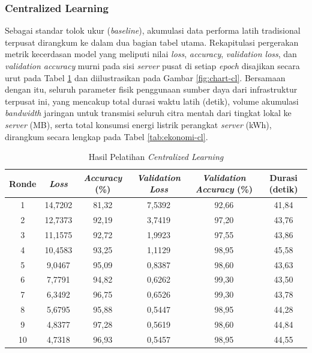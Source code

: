 \subsubsection{Centralized Learning}

Sebagai standar tolok ukur (\textit{baseline}), akumulasi data performa latih tradisional terpusat dirangkum ke dalam dua bagian tabel utama. Rekapitulasi pergerakan metrik kecerdasan model yang meliputi nilai \textit{loss}, \textit{accuracy}, \textit{validation loss}, dan \textit{validation accuracy} murni pada sisi \textit{server} pusat di setiap \textit{epoch} disajikan secara urut pada Tabel \ref{tab:hasil-cl} dan diilustrasikan pada Gambar \ref{fig:chart-cl}. Bersamaan dengan itu, seluruh parameter fisik penggunaan sumber daya dari infrastruktur terpusat ini, yang mencakup total durasi waktu latih (detik), volume akumulasi \textit{bandwidth} jaringan untuk transmisi seluruh citra mentah dari tingkat lokal ke \textit{server} (MB), serta total konsumsi energi listrik perangkat \textit{server} (kWh), dirangkum secara lengkap pada Tabel \ref{tab:ekonomi-cl}.

\begin{table}[H]
  \centering
  \caption{Hasil Pelatihan \textit{Centralized Learning}}
  \label{tab:hasil-cl}
  \begin{tabular}{|c|c|c|c|c|c|}
    \hline
    Ronde & \textit{Loss} & \textit{Accuracy} (\%) & \textit{Validation Loss} & \textit{Validation Accuracy} (\%) & Durasi (detik) \\
    \hline
    1 & 14,7202 & 81,32 & 7,5392 & 92,66 & 41,84 \\
    2 & 12,7373 & 92,19 & 3,7419 & 97,20 & 43,76 \\
    3 & 11,1575 & 92,72 & 1,9923 & 97,55 & 43,86 \\
    4 & 10,4583 & 93,25 & 1,1129 & 98,95 & 45,58 \\
    5 & 9,0467 & 95,09 & 0,8387 & 98,60 & 43,63 \\
    6 & 7,7791 & 94,82 & 0,6262 & 99,30 & 43,50 \\
    7 & 6,3492 & 96,75 & 0,6526 & 99,30 & 43,78 \\
    8 & 5,6795 & 95,88 & 0,5447 & 98,95 & 44,28 \\
    9 & 4,8377 & 97,28 & 0,5619 & 98,60 & 44,84 \\
    10 & 4,7318 & 96,93 & 0,5457 & 98,95 & 44,55 \\
    \hline
  \end{tabular}
\end{table}

